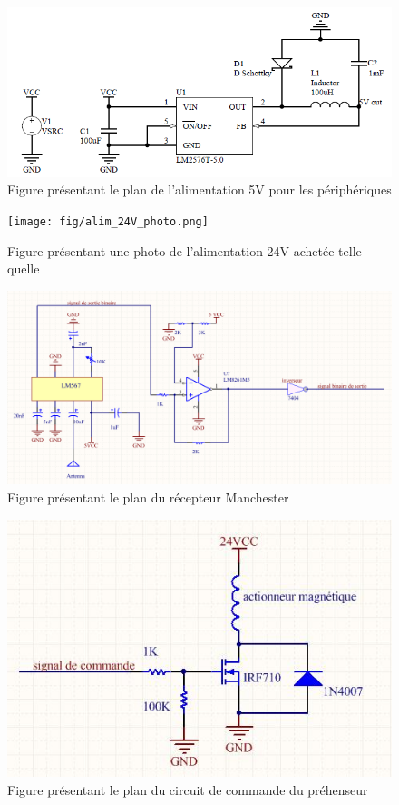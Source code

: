 \begin{figure}[htbp]
\centering
\includegraphics[scale=0.5]{fig/alim_5V.png}
\caption{Figure présentant le plan de l'alimentation 5V pour les périphériques}
\label{fig:alim5V}
\end{figure}

\begin{figure}[htbp]
\centering
\texttt{[image: fig/alim\_24V\_photo.png]}
\caption{Figure présentant une photo de l'alimentation 24V achetée telle quelle}
\label{fig:alim24Vphoto}
\end{figure}

\begin{figure}[htbp]
\centering
\includegraphics[scale=0.5]{fig/plan_manchester.png}
\caption{Figure présentant le plan du récepteur Manchester}
\label{fig:manchester}
\end{figure}

\begin{figure}[htbp]
\centering
\includegraphics[scale=0.5]{fig/prehenseur.jpg}
\caption{Figure présentant le plan du circuit de commande du préhenseur}
\label{fig:prehenseur}
\end{figure}


